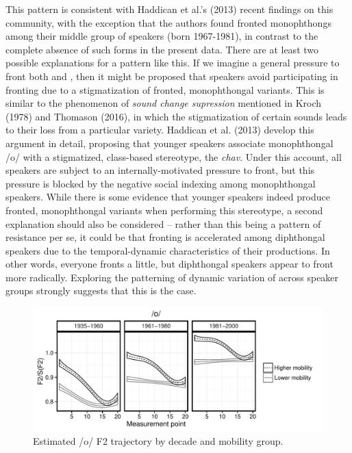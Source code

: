 \documentclass[12pt]{article}
\begin{document}
This pattern is consistent with Haddican et al.'s (2013) recent findings on this community, with the exception that the authors found fronted monophthongs among their middle group of speakers (born 1967-1981), in contrast to the complete absence of such forms in the present data. There are at least two possible explanations for a pattern like this. If we imagine a general pressure to front both  and , then it might be proposed that speakers avoid participating in  fronting due to a stigmatization of fronted, monophthongal variants. This is similar to the phenomenon of \textit{sound change supression} mentioned in Kroch (1978) and Thomason (2016), in which the stigmatization of certain sounds leads to their loss from a particular variety. Haddican et al. (2013) develop this argument in detail, proposing that younger speakers associate monophthongal /o/ with a stigmatized, class-based stereotype, the \textit{chav}. Under this account, all speakers are subject to an internally-motivated pressure to front, but this pressure is blocked by the negative social indexing among monophthongal speakers. While there is some evidence that younger speakers indeed produce fronted, monophthongal variants when performing this stereotype, a second explanation should also be considered -- rather than this being a pattern of resistance per se, it could be that fronting is accelerated among diphthongal speakers due to the temporal-dynamic characteristics of their  productions. In other words, everyone fronts  a little, but diphthongal speakers appear to front more radically. Exploring the patterning of dynamic variation of  across speaker groups strongly suggests that this is the case. 


\vspace*{6pt}
\begin{figure}[H]
\centering
\includegraphics[scale=0.9]{owdynamicsclass.pdf}
\caption{Estimated /o/ F2 trajectory by decade and mobility group.}
\end{figure}
\vspace*{6pt}
\end{document}
